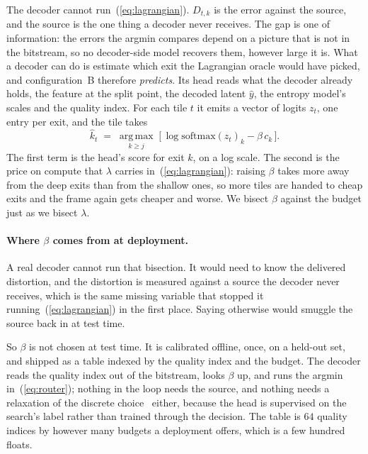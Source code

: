\documentclass[10pt,twocolumn,letterpaper]{article}
\begin{document}
The decoder cannot run~(\ref{eq:lagrangian}). $D_{t,k}$ is the error against the
source, and the source is the one thing a decoder never receives. The gap is one
of information: the errors the argmin compares depend on a picture that is not in
the bitstream, so no decoder-side model recovers them, however large it is. What
a decoder can do is estimate which exit the Lagrangian oracle would have picked, and
configuration~B therefore \emph{predicts}. Its head reads what the decoder
already holds, the feature at the split point, the decoded latent $\hat{y}$, the
entropy model's scales and the quality index. For each tile $t$ it emits a vector
of logits $z_t$, one entry per exit, and the tile takes
\begin{equation}
\hat{k}_t \;=\; \operatorname*{arg\,max}_{k \ge j} \;\bigl[\, \log \mathrm{softmax}(z_t)_k
                                       - \beta\, c_k \,\bigr].
\label{eq:router}
\end{equation}
The first term is the head's score for exit $k$, on a log scale. The second is
the price on compute that $\lambda$ carries in~(\ref{eq:lagrangian}): raising
$\beta$ takes more away from the deep exits than from the shallow ones, so more
tiles are handed to cheap exits and the frame again gets cheaper and worse. We
bisect $\beta$ against the budget just as we bisect $\lambda$.

\paragraph{Where $\beta$ comes from at deployment.} A real decoder cannot run
that bisection. It would need to know the delivered distortion, and the
distortion is measured against a source the decoder never receives, which is the
same missing variable that stopped it running~(\ref{eq:lagrangian}) in the first
place. Saying otherwise would smuggle the source back in at test time.

So $\beta$ is not chosen at test time. It is calibrated offline, once, on a
held-out set, and shipped as a table indexed by the quality index and the
budget. The decoder reads the quality index out of the bitstream, looks $\beta$
up, and runs the argmin in~(\ref{eq:router}); nothing in the loop needs the
source, and nothing needs a relaxation of the discrete choice~\cite{gumbel}
either, because the head is supervised on the search's label rather than trained
through the decision. The table is $64$ quality indices by however many budgets a deployment
offers, which is a few hundred floats.
\end{document}
